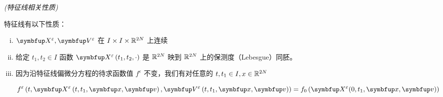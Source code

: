 \begin{lemma}\textit{(特征线相关性质)}

特征线有以下性质：
\begin{enumerate}[(i)]
    \item $\vect{X}^{\varepsilon},\vect{V}^{\varepsilon}$ 在 $I \times I \times {\mathbb{R}}^{2N}$ 上连续
    \item 给定 $t_{1}, t_{2} \in I$ 函数 $\vect{X}^{\varepsilon}\left(t_{1}, t_{2}, \cdot\right)$ 是 ${\mathbb{R}}^{2N}$ 映到 ${\mathbb{R}}^{2N}$ 上的保测度（Lebesgue）同胚。


    \item 因为沿特征线偏微分方程的待求函数值 $f^{\varepsilon}$ 不变，我们有对任意的 $t, t_{1} \in I, x \in {\mathbb{R}}^{2N}$
    
    $$f^{\varepsilon}\left(t, \vect{X}^{\varepsilon}\left(t, t_{1}, \vx, \vv\right), \vect{V}^{\varepsilon}\left(t, t_{1}, \vx, \vv\right)\right)=f_0\left(\vect{X}^{\varepsilon}(0, t_1, \vx, \vv)\right)$$


\end{enumerate}
\end{lemma}
